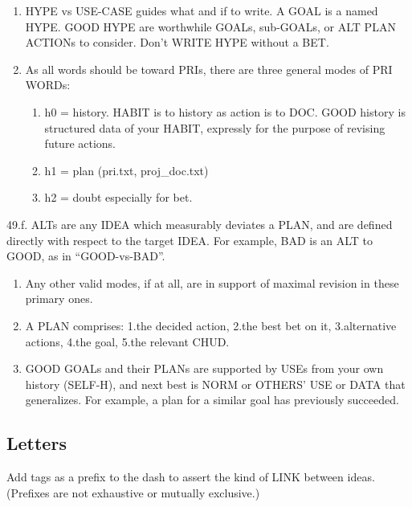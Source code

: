 \documentclass[
]{book}
\providecommand{\tightlist}{%
  \setlength{\itemsep}{0pt}\setlength{\parskip}{0pt}}
\begin{document}
\begin{enumerate}
\def\labelenumi{\arabic{enumi}.}
\setcounter{enumi}{46}
\tightlist
\item
  HYPE vs USE-CASE guides what and if to write. A GOAL is a named HYPE. GOOD HYPE are worthwhile GOALs, sub-GOALs, or ALT PLAN ACTIONs to consider. Don't WRITE HYPE without a BET.
\item
  As all words should be toward PRIs, there are three general modes of PRI WORDs:

  \begin{enumerate}
  \def\labelenumii{\arabic{enumii}.}
  \tightlist
  \item
    h0 = history. HABIT is to history as action is to DOC. GOOD history is structured data of your HABIT, expressly for the purpose of revising future actions.
  \item
    h1 = plan (pri.txt, proj\_doc.txt)
  \item
    h2 = doubt especially for bet.
  \end{enumerate}
\end{enumerate}

49.f. ALTs are any IDEA which measurably deviates a PLAN, and are defined directly with respect to the target IDEA. For example, BAD is an ALT to GOOD, as in ``GOOD-vs-BAD''.

\begin{enumerate}
\def\labelenumi{\arabic{enumi}.}
\setcounter{enumi}{49}
\item
  Any other valid modes, if at all, are in support of maximal revision in these primary ones.
\item
  A PLAN comprises:
  1.the decided action,
  2.the best bet on it,
  3.alternative actions,
  4.the goal,
  5.the relevant CHUD.
\item
  GOOD GOALs and their PLANs are supported by USEs from your own history (SELF-H), and next best is NORM or OTHERS' USE or DATA that generalizes. For example, a plan for a similar goal has previously succeeded.
\end{enumerate}

\hypertarget{letters}{%
\subsection{Letters}\label{letters}}

Add tags as a prefix to the dash
to assert the kind of LINK between ideas.
(Prefixes are not exhaustive or mutually exclusive.)
\end{document}
